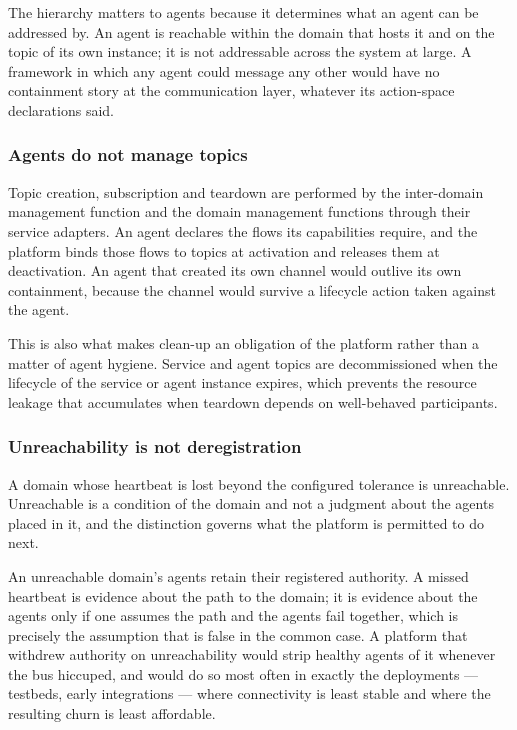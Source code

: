The hierarchy matters to agents because it determines what an agent can
be addressed by. An agent is reachable within the domain that hosts it
and on the topic of its own instance; it is not addressable across the
system at large. A framework in which any agent could message any other
would have no containment story at the communication layer, whatever its
action-space declarations said.

\hypertarget{agents-do-not-manage-topics}{%
\subsubsection{Agents do not manage topics}\label{agents-do-not-manage-topics}}

Topic creation, subscription and teardown are performed by the
inter-domain management function and the domain management functions
through their service adapters. An agent declares the flows its
capabilities require, and the platform binds those flows to topics at
activation and releases them at deactivation. An agent that created its
own channel would outlive its own containment, because the channel would
survive a lifecycle action taken against the agent.

This is also what makes clean-up an obligation of the platform rather
than a matter of agent hygiene. Service and agent topics are
decommissioned when the lifecycle of the service or agent instance
expires, which prevents the resource leakage that accumulates when
teardown depends on well-behaved participants.

\hypertarget{unreachability-is-not-deregistration}{%
\subsubsection{Unreachability is not deregistration}\label{unreachability-is-not-deregistration}}

A domain whose heartbeat is lost beyond the configured tolerance is
unreachable. Unreachable is a condition of the domain and not a judgment
about the agents placed in it, and the distinction governs what the
platform is permitted to do next.

An unreachable domain's agents retain their registered authority. A
missed heartbeat is evidence about the path to the domain; it is
evidence about the agents only if one assumes the path and the agents
fail together, which is precisely the assumption that is false in the
common case. A platform that withdrew authority on unreachability would
strip healthy agents of it whenever the bus hiccuped, and would do so
most often in exactly the deployments --- testbeds, early integrations
--- where connectivity is least stable and where the resulting churn is
least affordable.

